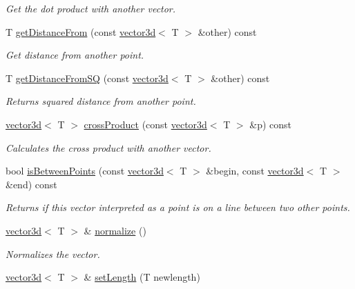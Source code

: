 \begin{DoxyCompactItemize}
\begin{DoxyCompactList}\small\item\em Get the dot product with another vector. \end{DoxyCompactList}\item 
T \hyperlink{classirr_1_1core_1_1vector3d_afd81bdc7d165f0e2082155127c3005e2}{get\+Distance\+From} (const \hyperlink{classirr_1_1core_1_1vector3d}{vector3d}$<$ T $>$ \&other) const 
\begin{DoxyCompactList}\small\item\em Get distance from another point. \end{DoxyCompactList}\item 
T \hyperlink{classirr_1_1core_1_1vector3d_afe85829b53b8ea449a4b51a2fb14c7be}{get\+Distance\+From\+SQ} (const \hyperlink{classirr_1_1core_1_1vector3d}{vector3d}$<$ T $>$ \&other) const 
\begin{DoxyCompactList}\small\item\em Returns squared distance from another point. \end{DoxyCompactList}\item 
\hyperlink{classirr_1_1core_1_1vector3d}{vector3d}$<$ T $>$ \hyperlink{classirr_1_1core_1_1vector3d_aa2470a12e1ef53f440c95df6249e9aa4}{cross\+Product} (const \hyperlink{classirr_1_1core_1_1vector3d}{vector3d}$<$ T $>$ \&p) const 
\begin{DoxyCompactList}\small\item\em Calculates the cross product with another vector. \end{DoxyCompactList}\item 
bool \hyperlink{classirr_1_1core_1_1vector3d_ace05ee3b68b47c2ec6baff0d9d64de98}{is\+Between\+Points} (const \hyperlink{classirr_1_1core_1_1vector3d}{vector3d}$<$ T $>$ \&begin, const \hyperlink{classirr_1_1core_1_1vector3d}{vector3d}$<$ T $>$ \&end) const 
\begin{DoxyCompactList}\small\item\em Returns if this vector interpreted as a point is on a line between two other points. \end{DoxyCompactList}\item 
\hyperlink{classirr_1_1core_1_1vector3d}{vector3d}$<$ T $>$ \& \hyperlink{classirr_1_1core_1_1vector3d_a84a1861464ef70e6965c146732103c09}{normalize} ()
\begin{DoxyCompactList}\small\item\em Normalizes the vector. \end{DoxyCompactList}\item 
\hyperlink{classirr_1_1core_1_1vector3d}{vector3d}$<$ T $>$ \& \hyperlink{classirr_1_1core_1_1vector3d_ae593448ac63803b3d254b0e6c7600f28}{set\+Length} (T newlength)\hypertarget{classirr_1_1core_1_1vector3d_ae593448ac63803b3d254b0e6c7600f28}{}\label{classirr_1_1core_1_1vector3d_ae593448ac63803b3d254b0e6c7600f28}


\end{DoxyCompactItemize}
